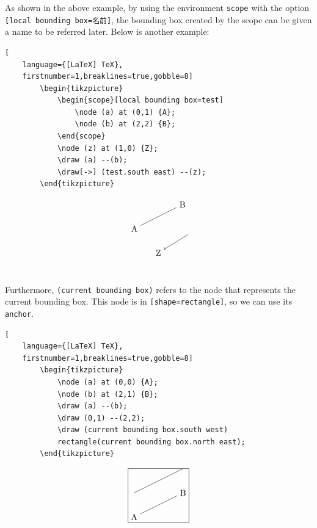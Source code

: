 \documentclass[lualatex]{jlreq}
\begin{document}
As shown in the above example, by using the environment \verb|scope| with the option \verb|[local bounding box=名前]|, the bounding box created by the scope can be given a name to be referred later. Below is another example:
\\[1em]
\begin{minipage}{0.68 \textwidth}
    \begin{lstlisting}[
    language={[LaTeX] TeX},
    firstnumber=1,breaklines=true,gobble=8]
        \begin{tikzpicture}
            \begin{scope}[local bounding box=test]
                \node (a) at (0,1) {A};
                \node (b) at (2,2) {B};
            \end{scope}
            \node (z) at (1,0) {Z};
            \draw (a) --(b);
            \draw[->] (test.south east) --(z);
        \end{tikzpicture}
    \end{lstlisting}
\end{minipage}
\hfill
\begin{minipage}{0.28 \textwidth}
    \[
        \begin{tikzpicture}
            \begin{scope}[local bounding box=test]
                \node (a) at (0,1) {A};
                \node (b) at (2,2) {B};
            \end{scope}
            \node (z) at (1,0) {Z};
            \draw (a) --(b);
            \draw[->] (test.south east) --(z);
        \end{tikzpicture}
    \]
\end{minipage}
\\[1em]

Furthermore, \verb|(current bounding box)| refers to the node that represents the current bounding box. This node is in \verb|[shape=rectangle]|, so we can use its \verb|anchor|.
\\[1em]
\begin{minipage}{0.68 \textwidth}
    \begin{lstlisting}[
    language={[LaTeX] TeX},
    firstnumber=1,breaklines=true,gobble=8]
        \begin{tikzpicture}
            \node (a) at (0,0) {A};
            \node (b) at (2,1) {B};
            \draw (a) --(b);
            \draw (0,1) --(2,2);
            \draw (current bounding box.south west)
            rectangle(current bounding box.north east);
        \end{tikzpicture}
    \end{lstlisting}
\end{minipage}
\hfill
\begin{minipage}{0.28 \textwidth}
    \[
        \begin{tikzpicture}
            \node (a) at (0,0) {A};
            \node (b) at (2,1) {B};
            \draw (a) --(b);
            \draw (0,1) --(2,2);
            \draw (current bounding box.south west)
            rectangle(current bounding box.north east);
        \end{tikzpicture}
    \]
\end{minipage}
\\[1em]
\end{document}
